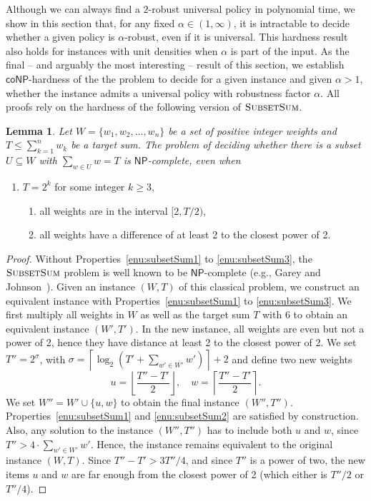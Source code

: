 \documentclass[11pt]{article}
\newtheorem{lemma}[theorem]{Lemma}
\newcommand{\classNP}{\mathsf{NP}}
\newcommand{\classcoNP}{\mathsf{coNP}}
\begin{document}
Although we can always find a $2$-robust universal policy in polynomial
time, we show in this section that, for any fixed $\alpha\in(1,\infty)$,
it is intractable to decide whether a given policy is $\alpha$-robust,
even if it is universal. This hardness result also holds for instances
with unit densities when $\alpha$ is part of the input. As the final
-- and arguably the most interesting -- result of this section, we
establish $\classcoNP$-hardness of the the problem to decide for
a given instance and given $\alpha>1$, whether the instance admits
a universal policy with robustness factor $\alpha$. All proofs rely
on the hardness of the following version of $\textsc{SubsetSum}$.
\begin{lemma}
\label{lem:subset_sum}Let $W=\{w_{1},w_{2},\dots,w_{n}\}$ be a set
of positive integer weights and $T\leq\sum_{k=1}^{n}w_{k}$ be a target
sum. The problem of deciding whether there is a subset $U\subseteq W$
with $\sum_{w\in U}w=T$ is $\classNP$-complete, even when\end{lemma}
\begin{enumerate}
\item $T=2^{k}$ for some integer $k\geq3$,\label{enu:subsetSum1}

\begin{enumerate}
\item all weights are in the interval $[2,T/2)$,\label{enu:subsetSum2}
\item all weights have a difference of at least 2 to the closest power of
2.\label{enu:subsetSum3}
\end{enumerate}
\end{enumerate}
\begin{proof}
Without Properties~\ref{enu:subsetSum1} to \ref{enu:subsetSum3},
the $\textsc{SubsetSum}$ problem is well known to be $\classNP$-complete
(e.g., Garey and Johnson~\cite{gareyJ79}). Given an instance $(W,T)$
of this classical problem, we construct an equivalent instance with
Properties~\ref{enu:subsetSum1} to \ref{enu:subsetSum3}. We first
multiply all weights in $W$ as well as the target sum $T$ with $6$
to obtain an equivalent instance $(W',T')$. In the new instance,
all weights are even but not a power of 2, hence they have distance
at least 2 to the closest power of 2. We set $T''=2^{\sigma}$, with
$\sigma=\left\lceil \log_{2}(T'+\sum_{w'\in W'}w')\right\rceil +2$
and define two new weights
\[
u=\left\lfloor \frac{T''-T'}{2}\right\rfloor ,\quad w=\left\lceil \frac{T''-T'}{2}\right\rceil .
\]
We set $W''=W'\cup\{u,w\}$ to obtain the final instance $(W'',T'')$.
Properties~\ref{enu:subsetSum1} and \ref{enu:subsetSum2} are satisfied
by construction. Also, any solution to the instance $(W'',T'')$ has
to include both $u$ and $w$, since $T''>4\cdot\sum_{w'\in W'}w'$.
Hence, the instance remains equivalent to the original instance $(W,T)$.
Since $T''-T'>3T''/4$, and since $T''$ is a power of two, the new
items $u$ and $w$ are far enough from the closest power of 2 (which
either is $T''/2$ or $T''/4$).
\end{proof}
\end{document}
